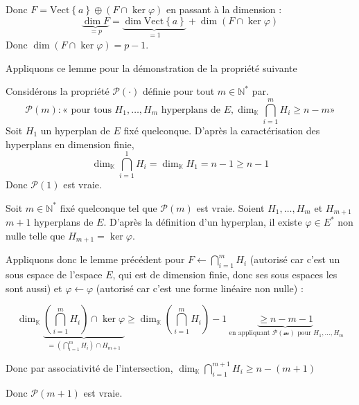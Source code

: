 \documentclass{article}
\begin{document}
\begin{question_kholle}
		Donc $F = \text{Vect} \left\{ a \right\} \oplus (F \cap \ker \varphi)$
		en passant à la dimension :
		$$
		\underbrace{ \dim F }_{= p } = \underbrace{ \dim \text{Vect} \left\{ a \right\} }_{ =1 } + \dim (F \cap \ker \varphi)
		$$
		Donc $\dim (F \cap \ker \varphi) = p - 1$.
		
		
		
		Appliquons ce lemme pour la démonstration de la propriété suivante \\
		
		Considérons la propriété $\mathcal{P}(\cdot)$ définie pour tout $m \in \mathbb{N}^{*}$ par.
		$$
		\mathcal{P}(m) : « \text{ pour tous } H_{1},\dots, H_{m} \text{ hyperplans de } E, \dim_{\mathbb{K}} \bigcap_{i=1}^{m}H_{i} \geqslant n-m »
		$$
		Soit $H_{1}$ un hyperplan de $E$ fixé quelconque. D'après la caractérisation des hyperplans en dimension finie, 
		$$
		\dim_{\mathbb{K}} \bigcap_{i=1}^{1}H_{i} = \dim_{\mathbb{K}}H_{1}= n-1 \geqslant n-1
		$$
		Donc $\mathcal{P}(1)$ est vraie.
		
		Soit $m \in \mathbb{N}^{*}$ fixé quelconque tel que $\mathcal{P}(m)$ est vraie.
		Soient $H_{1},\dots,H_{m}$ et $H_{m+1}$ $m+1$ hyperplans de $E$.
		D'après la définition d'un hyperplan, il existe $\varphi \in E ^{*}$ non nulle telle que $H_{m+1} = \ker \varphi$.
		
		Appliquons donc le lemme précédent pour $F \leftarrow \bigcap_{i=1}^{m}H_{i}$ (autorisé car c'est un sous espace de l'espace $E$, qui est de dimension finie, donc ses sous espaces les sont aussi) et $\varphi \leftarrow \varphi$ (autorisé car c'est une forme linéaire non nulle) :
		
		$$
		\dim_{\mathbb{K}} \underbrace{ \left( \bigcap_{i=1}^{m}H_{i} \right) \cap \ker \varphi  }_{ =\left( \bigcap_{i=1}^{m}H_{i}  \right)\cap H_{m+1} }\geqslant \dim_{\mathbb{K}} \left( \bigcap_{i=1}^{m}H_{i} \right) - 1 \underbrace{ \geqslant n - m - 1 }_{ \text{ en appliquant }\mathcal{P(m)} \text{ pour } H_{1},\dots,H_{m} }
		$$
		
		Donc par associativité de l'intersection, $\dim_{\mathbb{K}} \bigcap_{i=1}^{m+1}H_{i} \geqslant n - (m+1)$
		
		Donc $\mathcal{P}(m+1)$ est vraie.
	\end{question_kholle}
\end{document}
